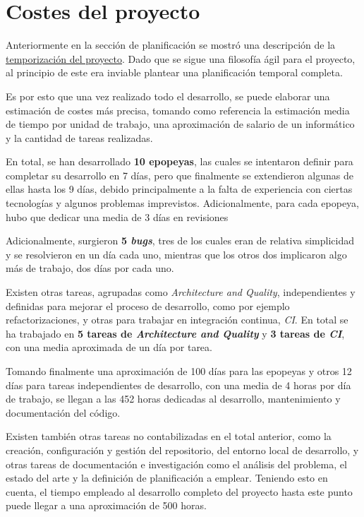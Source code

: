 \chapter{Costes del proyecto}

Anteriormente en la sección de planificación se mostró una descripción de la \hyperref[{TempSection}]{\underline{temporización del proyecto}}. Dado que se sigue una filosofía ágil para el proyecto, al principio de este era inviable plantear una planificación temporal completa.

Es por esto que una vez realizado todo el desarrollo, se puede elaborar una estimación de costes más precisa, tomando como referencia la estimación media de tiempo por unidad de trabajo, una aproximación de salario de un informático y la cantidad de tareas realizadas.

En total, se han desarrollado \textbf{10 epopeyas}, las cuales se intentaron definir para completar su desarrollo en 7 días, pero que finalmente se extendieron algunas de ellas hasta los 9 días, debido principalmente a la falta de experiencia con ciertas tecnologías y algunos problemas imprevistos. Adicionalmente, para cada epopeya, hubo que dedicar una media de 3 días en revisiones

Adicionalmente, surgieron \textbf{5 \textit{bugs}}, tres de los cuales eran de relativa simplicidad y se resolvieron en un día cada uno, mientras que los otros dos implicaron algo más de trabajo, dos días por cada uno.

Existen otras tareas, agrupadas como \textit{Architecture and Quality}, independientes y definidas para mejorar el proceso de desarrollo, como por ejemplo refactorizaciones, y otras para trabajar en integración continua, \textit{CI}. En total se ha trabajado en \textbf{5 tareas de \textit{Architecture and Quality}} y \textbf{3 tareas de \textit{CI}}, con una media aproximada de un día por tarea.

Tomando finalmente una aproximación de 100 días para las epopeyas y otros 12 días para tareas independientes de desarrollo, con una media de 4 horas por día de trabajo, se llegan a las 452 horas dedicadas al desarrollo, mantenimiento y documentación del código.

Existen también otras tareas no contabilizadas en el total anterior, como la creación, configuración y gestión del repositorio, del entorno local de desarrollo, y otras tareas de documentación e investigación como el análisis del problema, el estado del arte y la definición de planificación a emplear. Teniendo esto en cuenta, el tiempo empleado al desarrollo completo del proyecto hasta este punto puede llegar a una aproximación de 500 horas.

